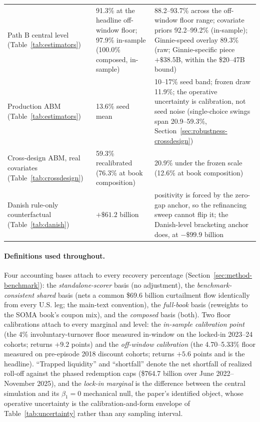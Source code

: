\documentclass[12pt]{article}
\begin{document}
\begin{table}[H]
\begin{threeparttable}
\begin{tabular}{@{}p{4.6cm}p{4.6cm}p{5.3cm}@{}}
Path B central level (Table~\ref{tab:estimators}) & 91.3\% at the headline off-window floor; 97.9\% in-sample (100.0\% composed, in-sample) & 88.2--93.7\% across the off-window floor range; covariate priors 92.2--99.2\% (in-sample); Ginnie-speed overlay 89.3\% (raw; Ginnie-specific piece $+\$38.5$B, within the \$20--47B bound) \\
Production ABM (Table~\ref{tab:estimators}) & 13.6\% seed mean & 10--17\% seed band; frozen draw 11.9\%; the operative uncertainty is calibration, not seed noise (single-choice swings span 20.9--59.3\%, Section~\ref{sec:robustness-crossdesign}) \\
Cross-design ABM, real covariates (Table~\ref{tab:crossdesign}) & 59.3\% recalibrated (76.3\% at book composition) & 20.9\% under the frozen scale (12.6\% at book composition) \\
Danish rule-only counterfactual (Table~\ref{tab:danish}) & $+\$61.2$ billion & positivity is forced by the zero-gap anchor, so the refinancing sweep cannot flip it; the Danish-level bracketing anchor does, at $-\$99.9$ billion \\
\bottomrule
\end{tabular}
\end{threeparttable}
\end{table}

\paragraph{Definitions used throughout.} Four accounting bases attach to every recovery percentage (Section~\ref{sec:method-benchmark}): the \emph{standalone-scorer} basis (no adjustment), the \emph{benchmark-consistent shared} basis (nets a common \$69.6 billion curtailment flow identically from every U.S. leg; the main-text convention), the \emph{full-book} basis (reweights to the SOMA book's coupon mix), and the \emph{composed} basis (both). Two floor calibrations attach to every marginal and level: the \emph{in-sample calibration point} (the 4\% involuntary-turnover floor measured in-window on the locked-in 2023--24 cohorts; returns $+9.2$ points) and the \emph{off-window calibration} (the 4.70--5.33\% floor measured on pre-episode 2018 discount cohorts; returns $+5.6$ points and is the headline). ``Trapped liquidity'' and ``shortfall'' denote the net shortfall of realized roll-off against the phased redemption caps (\$764.7 billion over June 2022--November 2025), and the \emph{lock-in marginal} is the difference between the central simulation and its $\beta_1 = 0$ mechanical null, the paper's identified object, whose operative uncertainty is the calibration-and-form envelope of Table~\ref{tab:uncertainty} rather than any sampling interval.
\end{document}

